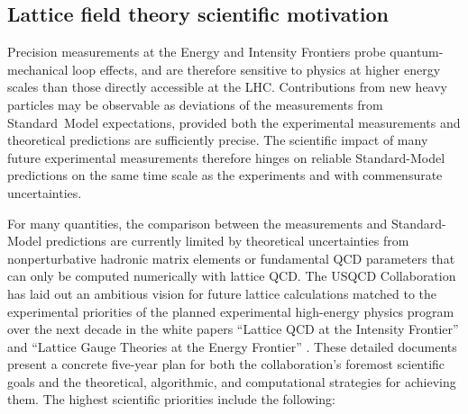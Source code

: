 \subsection{Lattice field theory scientific motivation}

Precision measurements at the Energy and Intensity Frontiers probe
quantum-mechanical loop effects, and are therefore sensitive to physics at
higher energy scales than those directly accessible at the LHC.  Contributions
from new heavy particles may be observable as deviations of the measurements
from Standard~Model expectations, provided both the experimental measurements
and theoretical predictions are sufficiently precise.  The scientific impact
of many future experimental measurements therefore hinges on reliable
Standard-Model predictions on the same time scale as the experiments and with
commensurate uncertainties.

For many quantities, the comparison between the measurements and
Standard-Model predictions are currently limited by theoretical uncertainties
from nonperturbative hadronic matrix elements or fundamental QCD parameters
that can only be computed numerically with lattice QCD.  The USQCD
Collaboration has laid out an ambitious vision for future lattice calculations
matched to the experimental priorities of the planned experimental high-energy
physics program over the next decade in the white papers ``Lattice QCD at the
Intensity Frontier'' and ``Lattice Gauge Theories at the Energy Frontier''
\cite{USQCD_IF_whitepaper13,USQCD_EF_whitepaper13}.  These detailed documents
present a concrete five-year plan for both the collaboration's foremost
scientific goals and the theoretical, algorithmic, and computational
strategies for achieving them.  The highest scientific priorities include
the following:

